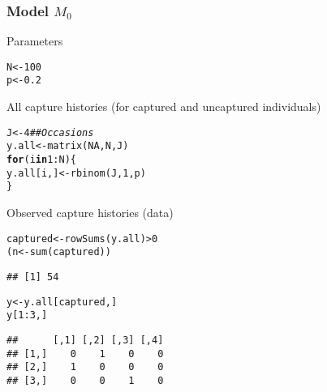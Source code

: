 \documentclass[color=usenames,dvipsnames]{beamer}\usepackage[]{graphicx}\usepackage[]{color}
\makeatletter
\newcommand{\hlnum}[1]{\textcolor[rgb]{0.69,0.494,0}{#1}}%
\newcommand{\hlcom}[1]{\textcolor[rgb]{0.514,0.506,0.514}{\textit{#1}}}%
\newcommand{\hlopt}[1]{\textcolor[rgb]{0,0,0}{#1}}%
\newcommand{\hlstd}[1]{\textcolor[rgb]{0,0,0}{#1}}%
\newcommand{\hlkwa}[1]{\textcolor[rgb]{0,0,0}{\textbf{#1}}}%
\newcommand{\hlkwb}[1]{\textcolor[rgb]{0,0.341,0.682}{#1}}%
\newcommand{\hlkwd}[1]{\textcolor[rgb]{0.004,0.004,0.506}{#1}}%
\newenvironment{kframe}{%
 \def\at@end@of@kframe{}%
 \ifinner\ifhmode%
  \def\at@end@of@kframe{\end{minipage}}%
  \begin{minipage}{\columnwidth}%
 \fi\fi%
 \def\FrameCommand##1{\hskip\@totalleftmargin \hskip-\fboxsep
 \colorbox{shadecolor}{##1}\hskip-\fboxsep
     \hskip-\linewidth \hskip-\@totalleftmargin \hskip\columnwidth}%
 \MakeFramed {\advance\hsize-\width
   \@totalleftmargin\z@ \linewidth\hsize
   \@setminipage}}%
 {\par\unskip\endMakeFramed%
 \at@end@of@kframe}
\newenvironment{knitrout}{}{} %
\makeatother
\begin{document}
\begin{frame}[fragile]
  \frametitle{Model $M_0$}
  \small
  Parameters
  \vspace{-6pt}
\begin{knitrout}\scriptsize
{}\color{fgcolor}\begin{kframe}
\begin{alltt}
\hlstd{N} \hlkwb{<-} \hlnum{100}
\hlstd{p} \hlkwb{<-} \hlnum{0.2}
\end{alltt}
\end{kframe}
\end{knitrout}
  \pause
  \vfill
  All capture histories (for captured and uncaptured individuals)
  \vspace{-6pt}
\begin{knitrout}\scriptsize
{}\color{fgcolor}\begin{kframe}
\begin{alltt}
\hlstd{J} \hlkwb{<-} \hlnum{4}  \hlcom{## Occasions}
\hlstd{y.all} \hlkwb{<-} \hlkwd{matrix}\hlstd{(}\hlnum{NA}\hlstd{, N, J)}
\hlkwa{for}\hlstd{(i} \hlkwa{in} \hlnum{1}\hlopt{:}\hlstd{N) \{}
    \hlstd{y.all[i,]} \hlkwb{<-} \hlkwd{rbinom}\hlstd{(J,} \hlnum{1}\hlstd{, p)}
\hlstd{\}}
\end{alltt}
\end{kframe}
\end{knitrout}
  \pause
  \vfill
  Observed capture histories (data)
  \vspace{-6pt}
\begin{knitrout}\scriptsize
{}\color{fgcolor}\begin{kframe}
\begin{alltt}
\hlstd{captured} \hlkwb{<-} \hlkwd{rowSums}\hlstd{(y.all)}\hlopt{>}\hlnum{0}
\hlstd{(n} \hlkwb{<-} \hlkwd{sum}\hlstd{(captured))}
\end{alltt}
\begin{verbatim}
## [1] 54
\end{verbatim}
\begin{alltt}
\hlstd{y} \hlkwb{<-} \hlstd{y.all[captured,]}
\hlstd{y[}\hlnum{1}\hlopt{:}\hlnum{3}\hlstd{,]}
\end{alltt}
\begin{verbatim}
##      [,1] [,2] [,3] [,4]
## [1,]    0    1    0    0
## [2,]    1    0    0    0
## [3,]    0    0    1    0
\end{verbatim}
\end{kframe}
\end{knitrout}
\end{frame}
\end{document}
